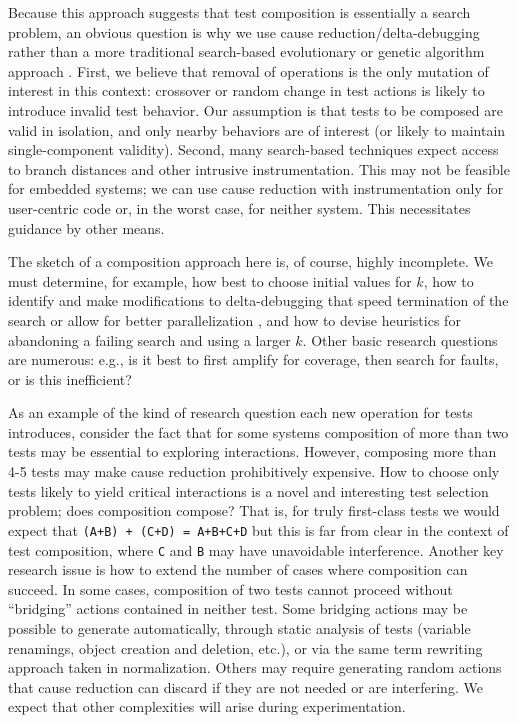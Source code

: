 Because this approach suggests that test composition is essentially a
search problem, an obvious question is why we use cause
reduction/delta-debugging rather than a more traditional search-based
evolutionary or genetic algorithm approach \cite{searchtest,McMinn04search-basedsoftware,FA11}.  First, we believe that
removal of operations is the only mutation of interest in this
context: crossover or random change in test actions is likely to
introduce invalid test behavior.  Our assumption is that tests to be
composed are valid in isolation, and only nearby behaviors are of
interest (or likely to maintain single-component validity).  Second,
many search-based techniques expect access to branch distances and
other intrusive instrumentation.  This may not be feasible for
embedded systems; we can use cause reduction with instrumentation only
for user-centric code or, in the worst case, for neither system.  This
necessitates guidance by other means.


The sketch of a composition approach here is, of course, highly
incomplete. We must determine, for example, how best to choose initial
values for $k$, how to identify and make modifications to
delta-debugging that speed termination of the search or allow for
better parallelization \cite{PracMin}, and how to devise heuristics for abandoning a
failing search and using a larger $k$.  Other basic research questions
are numerous: e.g., is it best to first amplify for coverage, then
search for faults, or is this inefficient?

As an example of the kind of research question each new operation for
tests introduces, consider the fact that for some systems composition
of more than two tests may be essential to exploring interactions.
However, composing more than 4-5 tests may make cause reduction
prohibitively expensive.  How to choose only tests likely to yield
critical interactions is a novel and interesting test selection
\cite{YooHarman} problem; does composition compose?  That is, for
truly first-class tests we would expect that {\tt (A+B) + (C+D) =
  A+B+C+D} but this is far from clear in the context of test
composition, where {\tt C} and {\tt B} may have unavoidable
interference.  Another key research issue is how to extend the number
of cases where composition can succeed.  In some cases, composition of
two tests cannot proceed without ``bridging'' actions contained in
neither test.  Some bridging actions may be possible to generate
automatically, through static analysis of tests (variable renamings,
object creation and deletion, etc.), or via the same term rewriting
approach taken in normalization.  Others may require generating
random actions \cite{HamletOnly,RandFormal,DirectedSwarm,Pacheco} that cause reduction can discard if they are not needed
or are interfering.  We expect that other complexities will arise
during experimentation.

